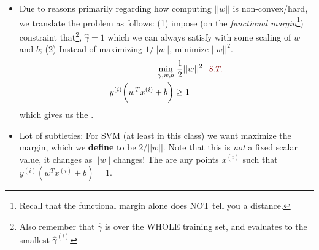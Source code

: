 \documentclass[12pt]{article}
\newcommand{\myspace}{\vspace{2\bigskipamount}}
\begin{document}
\begin{itemize}
\begin{itemize}
		\item Due to reasons primarily regarding how computing $||w||$ is non-convex/hard, we translate the problem as follows: (1) impose (on the \textit{functional margin}\footnote{Recall that the functional margin alone does NOT tell you a distance.}) constraint that\footnote{Also remember that $\hat{\gamma}$ is over the WHOLE training set, and evaluates to the smallest $\hat{\gamma}^{(i)}$}, $\hat{\gamma} = 1$ which we can always satisfy with some scaling of $w$ and $b$; (2) Instead of maximizing $1/||w||$, minimize $||w||^2$. 
		\begin{align}
		\min_{\gamma, w, b}& ~ \onehalf ||w||^2 ~~ \mred{S.T.} \\
		y^{(i)} \bigg(w^T x^{(i)}+ b\bigg)& \ge 1
		\end{align}
		which gives us the .
		
		\item Lot of subtleties: For SVM (at least in this class) we want maximize the margin, which we \textbf{define} to be $2/||w||$. Note that this is \textit{not} a fixed scalar value, it changes as $||w||$ changes! The  are any points $x^{(i)}$ such that $y^{(i)}(w^T x^{(i)} + b) = 1$. 
	\end{itemize}
\end{itemize}
\myspace 
\end{document}
